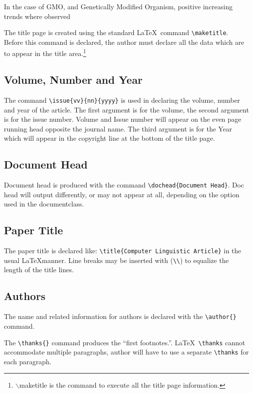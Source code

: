 \documentclass{clv3}
\begin{document}
In the case of GMO, and Genetically Modified Organism, positive increasing trends where observed

The title page is created using the standard \LaTeX\ command \verb|\maketitle|.
Before this command is declared, the author must declare all the data which are
to appear in the title area.\footnote{$\backslash$maketitle is the command to execute all the title page information.}

\subsection{Volume, Number and Year}

The command \verb|\issue{vv}{nn}{yyyy}| is used in declaring the volume, number
and year of the article. The first argument is for the volume, the second argument
is for the issue number. Volume and Issue number will appear on the even page
running head opposite the journal name. The third argument is for the Year which
will appear in the copyright line at the bottom of the title page.

\subsection{Document Head}

Document head is produced with the command \verb|\dochead{Document Head}|. Doc head
will output differently, or may not appear at all, depending on the option used in the
documentclass.

\subsection{Paper Title}

The paper title is declared like: \verb|\title{Computer Linguistic Article}|
in the usual \LaTeX manner. Line breaks may be inserted with (\verb|\\|) to equalize
the length of the title lines.

\subsection{Authors}
The name and related information for authors is declared with the \verb|\author{}| command.

The \verb|\thanks{}| command produces the ``first footnotes.''. \LaTeX\ \verb|\thanks|
cannot accommodate multiple paragraphs, author will have to use a separate \verb|\thanks|
for each paragraph.
\end{document}

